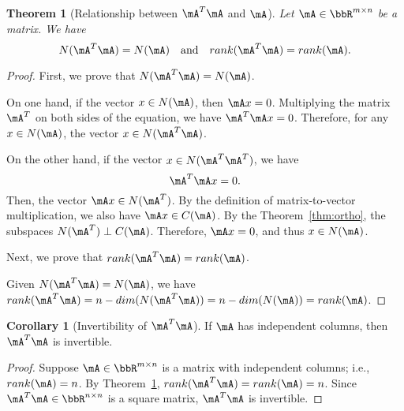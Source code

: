 \documentclass[11pt]{article}
\theoremstyle{plain}
\newtheorem{thm}{Theorem}[section]
\theoremstyle{definition}
\newtheorem{cor}{Corollary}
\begin{document}
\begin{thm}[Relationship between $\mA^T \mA$ and $\mA$]\label{thm:aa}Let $\mA \in \bbR^{m \times n}$ be a matrix. We have
	\begin{equation}
		N(\mA^T \mA) = N(\mA) \quad \text{and} \quad rank(\mA^T \mA) = rank(\mA).
	\end{equation}
\end{thm}
\begin{proof}
	First, we prove that $N(\mA^T \mA) = N(\mA)$.
	
	On one hand, if the vector $x \in N(\mA)$, then $\mA x = 0$. Multiplying the matrix $\mA^T$ on both sides of the equation, we have $ \mA^T  \mA x = 0$. Therefore, for any $x \in N(\mA)$, the vector $x \in N(\mA^T \mA)$. 
	\iffalse
	
	On the other hand, we  prove  by contradiction that for any $x \in N(\mA^T \mA)$ the vector $x \in N(\mA)$.
	
	Suppose there is a vector $x \in N(\mA^T \mA^T)$ but $x \notin N(\mA)$. We have
	\begin{equation}\label{eq:aaa}
		\mA x = b \neq 0, \quad \mA^T \mA x = 0 \quad \Rightarrow \quad \mA^T b = 0.
	\end{equation} 
	By the first equality in \eqref{eq:aaa}, $b \in C(\mA)$, and by the third equation in \eqref{eq:aaa}, $ b \in N(\mA^T)$. This contradicts the Theorem~\ref{thm:ortho} that $C(\mA) \perp N(\mA^T)$. Therefore, for any $x \in N(\mA^T \mA)$, the vector $x \in N(\mA)$.
	
	\fi
	
	On the other hand, if the vector $x \in N(\mA^T \mA^T)$, we have
	\[ \mA^T \mA x = 0.\]
	Then, the vector $\mA x \in N(\mA^T)$. By the definition of matrix-to-vector multiplication, we also have $\mA x \in C(\mA)$.  By the Theorem~\ref{thm:ortho}, the subspaces $N(\mA^T) \perp C(\mA)$. Therefore, $\mA x = 0$, and thus $x \in N(\mA)$.
	\vspace{0.2cm}
	
	Next, we prove that $rank(\mA^T \mA) = rank(\mA)$. 
	
	Given $N(\mA^T \mA) = N(\mA)$, we have $rank(\mA^T \mA) = n - dim(N(\mA^T \mA)) = n - dim(N(\mA)) = rank(\mA)$.
\end{proof}

\begin{cor}[Invertibility of $\mA^T \mA$]\label{cor:invert}
	If $\mA$ has independent columns, then $\mA^T \mA$ is invertible.
\end{cor}
\begin{proof}
Suppose $\mA \in \bbR^{m \times n}$ is a matrix with independent columns; i.e., $rank(\mA) = n$. By Theorem~\ref{thm:aa}, $rank(\mA^T \mA) = rank(\mA) = n$. Since $\mA^T \mA \in \bbR^{n \times n}$ is a square matrix, $\mA^T \mA$ is invertible.
\end{proof}
\end{document}
